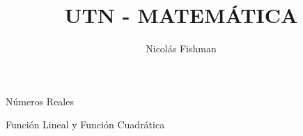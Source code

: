\documentclass[12pt]{report}
\title{UTN - MATEMÁTICA}
\author{Nicolás Fishman}
\date{}
\begin{document}
\maketitle
\tableofcontents

\begin{itemize}
    {\item Números Reales}
     {\item Función Lineal y Función Cuadrática}
\end{itemize}




\end{document}
